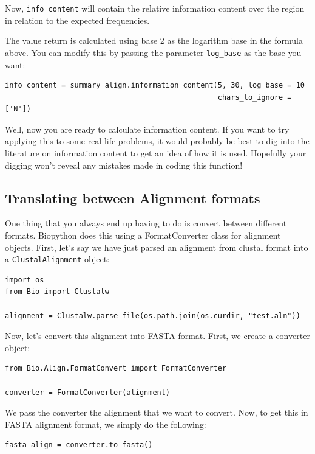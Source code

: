 \documentclass{report}
\begin{document}
Now, \verb|info_content| will contain the relative information content over the region in relation to the expected frequencies.


The value return is calculated using base 2 as the logarithm base in the formula above. You can modify this by passing the parameter \verb|log_base| as the base you want:

\begin{verbatim}
info_content = summary_align.information_content(5, 30, log_base = 10
                                                 chars_to_ignore = ['N'])
\end{verbatim}

Well, now you are ready to calculate information content. If you want to try applying this to some real life problems, it would probably be best to dig into the literature on information content to get an idea of how it is used. Hopefully your digging won't reveal any mistakes made in coding this function!

\subsection{Translating between Alignment formats}
\label{sec:align_translate}

One thing that you always end up having to do is convert between different formats. Biopython does this using a FormatConverter class for alignment objects. First, let's say we have just parsed an alignment from clustal format into a \verb|ClustalAlignment| object:

\begin{verbatim}
import os
from Bio import Clustalw

alignment = Clustalw.parse_file(os.path.join(os.curdir, "test.aln"))
\end{verbatim}

Now, let's convert this alignment into FASTA format. First, we create a converter object:

\begin{verbatim}
from Bio.Align.FormatConvert import FormatConverter

converter = FormatConverter(alignment)
\end{verbatim}

We pass the converter the alignment that we want to convert. Now, to get this in FASTA alignment format, we simply do the following:

\begin{verbatim}
fasta_align = converter.to_fasta()
\end{verbatim}
\end{document}
